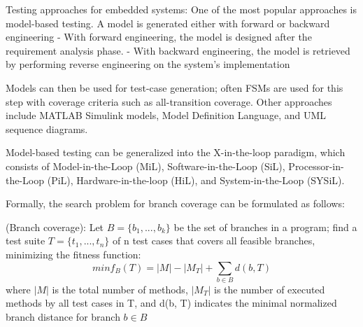 Testing approaches for embedded systems:
One of the most popular approaches is model-based testing. A model is generated either with forward or backward engineering
	- With forward engineering, the model is designed after the requirement analysis phase.
	- With backward engineering, the model is retrieved by performing reverse engineering on the system's implementation

Models can then be used for test-case generation; often FSMs are used for this step with coverage criteria such as all-transition coverage. Other approaches include MATLAB Simulink models, Model Definition Language, and UML sequence diagrams.

Model-based testing can be generalized into the X-in-the-loop paradigm, which consists of Model-in-the-Loop (MiL), Software-in-the-Loop (SiL), Processor-in-the-Loop (PiL), Hardware-in-the-loop (HiL), and System-in-the-Loop (SYSiL).






Formally, the search problem for branch coverage can be formulated as follows:

\begin{problem}(Branch coverage):
    Let $ B = \{b_1,...,b_k\} $ be the set of branches in a program; find a test suite $ T = \{t_1,...,t_n \} $ of n test cases that covers all feasible branches, minimizing the fitness function:
    \begin{equation}
        min f_B (T) = |M| - |M_T| + \sum_{b \in B} d(b, T)
    \end{equation}
    where $|M|$ is the total number of methods, $|M_T|$ is the number of executed methods by all test cases in T, and d(b, T) indicates the minimal normalized branch distance for branch $ b \in B $
\end{problem}